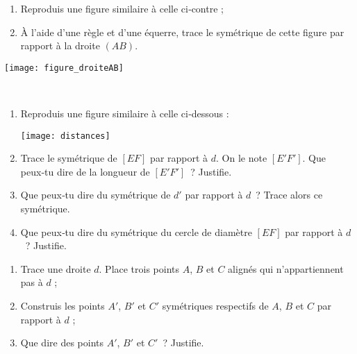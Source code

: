 \begin{exercice}
\begin{minipage}[c]{0.44\linewidth}
\begin{enumerate}
 \item Reproduis une figure similaire à celle ci‑contre ;
 \item À l'aide d'une règle et d'une équerre, trace le symétrique de cette figure par rapport à la droite $(AB)$.
 \end{enumerate}
 \end{minipage} \hfill%
 \begin{minipage}[c]{0.52\linewidth}
  \texttt{[image: figure\_droiteAB]}
   \end{minipage} \\
\end{exercice}

\columnbreak

\begin{exercice}
\begin{enumerate}
 \item Reproduis une figure similaire à celle ci‑dessous : 
 \begin{center} \texttt{[image: distances]} \end{center}
 \item Trace le symétrique de $[EF]$ par rapport à $d$. On le note $[E'F']$. Que peux‑tu dire de la longueur de $[E'F']$ ? Justifie.
 \item Que peux‑tu dire du symétrique de $d'$ par rapport à $d$ ? Trace alors ce symétrique.
 \item Que peux‑tu dire du symétrique du cercle de diamètre $[EF]$ par rapport à $d$ ? Justifie.
 \end{enumerate}
\end{exercice}


\begin{exercice}
\begin{enumerate}
 \item Trace une droite $d$. Place trois points $A$, $B$ et $C$ alignés qui n'appartiennent pas à $d$ ;
 \item Construis les points $A'$, $B'$ et $C'$ symétriques respectifs de $A$, $B$ et $C$ par rapport à $d$ ;
 \item Que dire des points $A'$, $B'$ et $C'$ ? Justifie.
 \end{enumerate}
\end{exercice}


